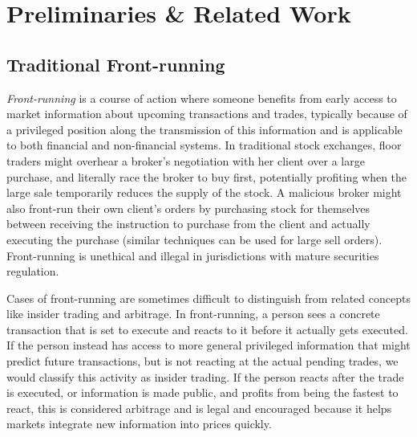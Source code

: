

\section{Preliminaries \& Related Work}

\subsection{Traditional Front-running} 
\label{sec:What is front-running?}

\emph{Front-running} is a course of action where someone benefits from early access to market information about upcoming transactions and trades, typically because of a privileged position along the transmission of this information and is applicable to both financial and non-financial systems. In traditional stock exchanges, floor traders might overhear a broker's negotiation with her client over a large purchase, and literally race the broker to buy first, potentially profiting when the large sale temporarily reduces the supply of the stock. A malicious broker might also front-run their own client's orders by purchasing stock for themselves between receiving the instruction to purchase from the client and actually executing the purchase (similar techniques can be used for large sell orders). Front-running is unethical and illegal in jurisdictions with mature securities regulation. 

Cases of front-running are sometimes difficult to distinguish from related concepts like insider trading and arbitrage. In front-running, a person sees a concrete transaction that is set to execute and reacts to it before it actually gets executed. If the person instead has access to more general privileged information that might predict future transactions, but is not reacting at the actual pending trades, we would classify this activity as insider trading. If the person reacts after the trade is executed, or information is made public, and profits from being the fastest to react, this is considered arbitrage and is legal and encouraged because it helps markets integrate new information into prices quickly.


